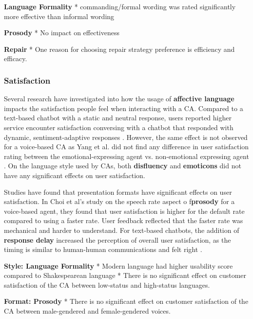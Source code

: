 \textbf{Language Formality}
* commanding/formal wording was rated significantly more effective than informal wording \cite{jestin2022effects}\cmt{[81]}

\textbf{Prosody}
* No impact on effectiveness \cite{jestin2022effects}\cmt{[81]}

\textbf{Repair}
* One reason for choosing repair strategy preference is efficiency and efficacy. \cite{ashktorab2019resilient}\cmt{[88]}

\subsubsection{Satisfaction}
Several research have investigated into how the usage of \textbf{affective language} impacts the satisfaction people feel when interacting with a CA. Compared to a text-based chatbot with a static and neutral response, users reported higher service encounter satisfaction conversing with a chatbot that responded with dynamic, sentiment-adaptive responses \cite{diederich2019emulating}\cmt{[25]}. However, the same effect is not observed for a voice-based CA as Yang et al. did not find any difference in user satisfaction rating between the emotional-expressing agent vs. non-emotional expressing agent \cite{yang2017perceived}\cmt{[44]}. On the language style used by CAs, both \textbf{disfluency} \cite{pfeifer2009should}\cmt{[12]} and \textbf{emoticons} \cite{wilhelm2022keep}\cmt{[28]} did not have any significant effects on user satisfaction.

Studies have found that presentation formats have significant effects on user satisfaction. In Choi et al's study \cite{choi2020nobody}\cmt{[54]} on the speech rate aspect o f\textbf{prosody} for a voice-based agent, they found that user satisfaction is higher for the default rate compared to using a faster rate. User feedback reflected that the faster rate was mechanical and harder to understand. For text-based chatbots, the addition of \textbf{response delay} increased the perception of overall user satisfaction, as the timing is similar to human-human communications and felt right \cite{gnewuch2018faster}\cmt{[19]}. 

\textbf{Style: Language Formality}
* Modern language had higher usability score compared to Shakespearean language \cite{elsholz2019exploring}\cmt{[61]}
* There is no significant effect on customer satisfaction of the CA between low-status and high-status languages. \cite{habler2019effects}\cmt{[63]}

\textbf{Format: Prosody}
* There is no significant effect on customer satisfaction of the CA between male-gendered and female-gendered voices. \cite{habler2019effects}\cmt{[63]}

